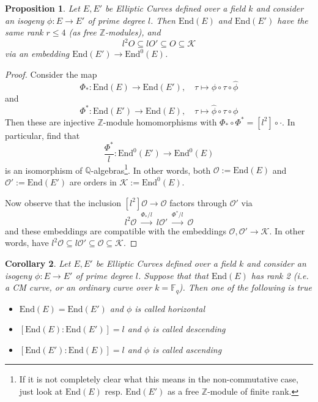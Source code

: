 \documentclass{scrartcl}
\newcommand{\Z}{\mathbb{Z}}
\newcommand{\F}{\mathbb{F}}
\newcommand{\End}{\mathrm{End}}
\renewcommand{\O}{O}
\newcommand{\Order}{\mathcal{O}}
\newtheorem{prop}{Proposition}[section]
\newtheorem{corollary}[prop]{Corollary}
\theoremstyle{definition}
\begin{document}
\begin{prop}
    Let $E, E'$ be Elliptic Curves defined over a field $k$ and consider an isogeny $\phi: E \to E'$ of prime degree $l$.
    Then $\End(E)$ and $\End(E')$ have the same rank $r \leq 4$ (as free $\Z$-modules), and
    \begin{equation*}
        l^2\O \subseteq l\O' \subseteq \O \subseteq \mathcal{K}
    \end{equation*}
    via an embedding $\End(E') \to \End^0(E)$.
\end{prop}
\begin{proof}
    Consider the map
    \begin{equation*}
        \Phi_*: \End(E) \to \End(E'), \quad \tau \mapsto \phi \circ \tau \circ \hat{\phi}
    \end{equation*}
    and
    \begin{equation*}
        \Phi^*: \End(E') \to \End(E), \quad \tau \mapsto \hat{\phi} \circ \tau \circ \phi
    \end{equation*}
    Then these are injective $\Z$-module homomorphisms with $\Phi_* \circ \Phi^* = [l^2] \circ \cdot$.
    In particular, find that
    \begin{equation*}
        \frac {\Phi^*} l : \End^0(E') \to \End^0(E)
    \end{equation*}
    is an isomorphism of $\mathbb{Q}$-algebras\footnote{If it is not completely clear what this means in the non-commutative case, just look at $\End(E)$ resp. $\End(E')$ as a free $\Z$-module of finite rank.}.
    In other words, both $\Order := \End(E)$ and $\Order' := \End(E')$ are orders in $\mathcal{K} := \End^0(E)$.

    Now observe that the inclusion $[l^2]\Order \to \Order$ factors through $\Order'$ via
    \begin{equation*}
        l^2 \Order \ \overset{\Phi_* / l}{\to} \ l \Order' \ \overset{\Phi^* / l}{\to} \ \Order
    \end{equation*}
    and these embeddings are compatible with the embeddings $\Order, \Order' \to \mathcal{K}$.
    In other words, have $l^2\Order \subseteq l\Order' \subseteq \Order \subseteq \mathcal{K}$.
\end{proof}
\begin{corollary}
    Let $E, E'$ be Elliptic Curves defined over a field $k$ and consider an isogeny $\phi: E \to E'$ of prime degree $l$.
    Suppose that that $\End(E)$ has rank 2 (i.e. a CM curve, or an ordinary curve over $k = \F_q$).
    Then one of the following is true
    \begin{itemize}
        \item $\End(E) = \End(E')$ and $\phi$ is called \emph{horizontal}
        \item $[\End(E) : \End(E')] = l$ and $\phi$ is called \emph{descending}
        \item $[\End(E') : \End(E)] = l$ and $\phi$ is called \emph{ascending}
    \end{itemize}
\end{corollary}
\end{document}
